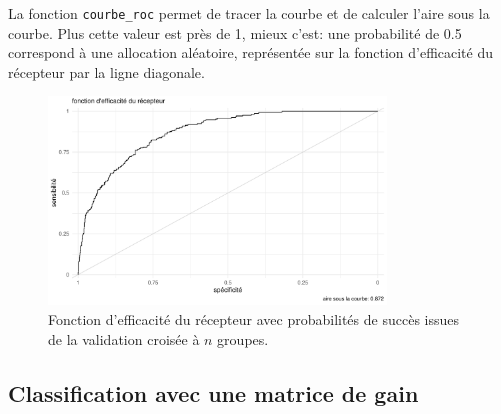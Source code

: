 \documentclass[
  11pt,
  letterpaper,
]{scrbook}
\newenvironment{Shaded}{\begin{snugshade}}{\end{snugshade}}
\newcommand{\AttributeTok}[1]{\textcolor[rgb]{0.40,0.45,0.13}{#1}}
\newcommand{\CommentTok}[1]{\textcolor[rgb]{0.37,0.37,0.37}{#1}}
\newcommand{\ConstantTok}[1]{\textcolor[rgb]{0.56,0.35,0.01}{#1}}
\newcommand{\DocumentationTok}[1]{\textcolor[rgb]{0.37,0.37,0.37}{\textit{#1}}}
\newcommand{\FunctionTok}[1]{\textcolor[rgb]{0.28,0.35,0.67}{#1}}
\newcommand{\NormalTok}[1]{\textcolor[rgb]{0.00,0.23,0.31}{#1}}
\newcommand{\OtherTok}[1]{\textcolor[rgb]{0.00,0.23,0.31}{#1}}
\newcommand{\SpecialCharTok}[1]{\textcolor[rgb]{0.37,0.37,0.37}{#1}}
\theoremstyle{definition}
\theoremstyle{remark}
\begin{document}
La fonction \texttt{courbe\_roc} permet de tracer la courbe et de
calculer l'aire sous la courbe. Plus cette valeur est près de 1, mieux
c'est: une probabilité de 0.5 correspond à une allocation aléatoire,
représentée sur la fonction d'efficacité du récepteur par la ligne
diagonale.

\begin{figure}[ht!]

{\centering \includegraphics[width=0.8\textwidth,height=\textheight]{./05-reglogistique_files/figure-pdf/fig-roccurve-1.pdf}

}

\caption{\label{fig-roccurve}Fonction d'efficacité du récepteur avec
probabilités de succès issues de la validation croisée à \(n\) groupes.}

\end{figure}

\begin{Shaded}
\end{Shaded}

\hypertarget{classification-avec-une-matrice-de-gain}{%
\subsection{Classification avec une matrice de
gain}\label{classification-avec-une-matrice-de-gain}}
\end{document}
